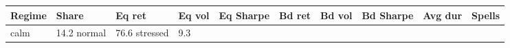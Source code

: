 \begin{tabular}{llllllllrr}
\toprule
Regime & Share & Eq ret & Eq vol & Eq Sharpe & Bd ret & Bd vol & Bd Sharpe & Avg dur & Spells \\
\midrule
calm & 14.2%
normal & 76.6%
stressed & 9.3%
\bottomrule
\end{tabular}
